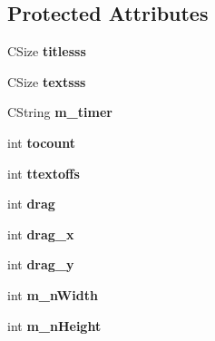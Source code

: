 \subsection*{Protected Attributes}
\begin{DoxyCompactItemize}
\item 
\hypertarget{class_c_msg_box_a0424cbe98d7139ac5767f88d2b1bb63b}{C\-Size {\bfseries titlesss}}\label{class_c_msg_box_a0424cbe98d7139ac5767f88d2b1bb63b}

\item 
\hypertarget{class_c_msg_box_af1788723f254b7878017f0186703830e}{C\-Size {\bfseries textsss}}\label{class_c_msg_box_af1788723f254b7878017f0186703830e}

\item 
\hypertarget{class_c_msg_box_aa06628d1c71802ba764d605782a42875}{C\-String {\bfseries m\-\_\-timer}}\label{class_c_msg_box_aa06628d1c71802ba764d605782a42875}

\item 
\hypertarget{class_c_msg_box_af0e21526b2c52fb3e0c7e43f55d72894}{int {\bfseries tocount}}\label{class_c_msg_box_af0e21526b2c52fb3e0c7e43f55d72894}

\item 
\hypertarget{class_c_msg_box_a7f52ce6957c3213520cef4553b84800e}{int {\bfseries ttextoffs}}\label{class_c_msg_box_a7f52ce6957c3213520cef4553b84800e}

\item 
\hypertarget{class_c_msg_box_a3bd4c0bbbd1f15290dedc3a3064f0e55}{int {\bfseries drag}}\label{class_c_msg_box_a3bd4c0bbbd1f15290dedc3a3064f0e55}

\item 
\hypertarget{class_c_msg_box_a428507d1d24e5d844547ff72f644f273}{int {\bfseries drag\-\_\-x}}\label{class_c_msg_box_a428507d1d24e5d844547ff72f644f273}

\item 
\hypertarget{class_c_msg_box_a4074521054acae0452beebe45b0cff9d}{int {\bfseries drag\-\_\-y}}\label{class_c_msg_box_a4074521054acae0452beebe45b0cff9d}

\item 
\hypertarget{class_c_msg_box_a0c47563db599d7acc22e17a39bab29a9}{int {\bfseries m\-\_\-n\-Width}}\label{class_c_msg_box_a0c47563db599d7acc22e17a39bab29a9}

\item 
\hypertarget{class_c_msg_box_a8380401c7c8e325f0bc1617375554388}{int {\bfseries m\-\_\-n\-Height}}\label{class_c_msg_box_a8380401c7c8e325f0bc1617375554388}


\end{DoxyCompactItemize}
